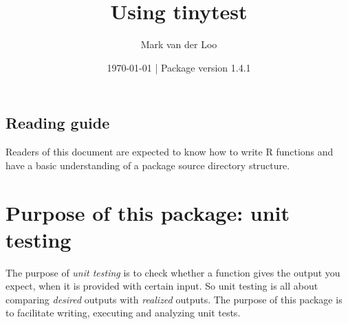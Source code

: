 \documentclass[11pt]{article}
\title{Using tinytest}
\author{Mark van der Loo}
\date{\today{} | Package version 1.4.1}
\begin{document}
\newlength{\fancyvrbtopsep}
\newlength{\fancyvrbpartopsep}
\makeatletter
\FV@AddToHook{\FV@ListParameterHook}{\topsep=\fancyvrbtopsep\partopsep=\fancyvrbpartopsep}
\makeatother


\setlength{\fancyvrbtopsep}{0pt}
\setlength{\fancyvrbpartopsep}{0pt}
\maketitle{}
\thispagestyle{empty}

\tableofcontents{}


\subsection*{Reading guide}
Readers of this document are expected to know how to write R functions
and have a basic understanding of a package source directory structure.



\newpage{}

\section{Purpose of this package: unit testing}

The purpose of \emph{unit testing} is to check whether a function gives the
output you expect, when it is provided with certain input. So unit testing is
all about comparing \emph{desired} outputs with \emph{realized} outputs. The
purpose of this package is to facilitate writing, executing and analyzing unit
tests.


\end{document}
